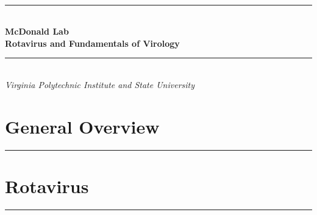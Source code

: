 \documentclass[11pt, final]{article}
\begin{document}
	
	\newcommand{\HRule}{\rule{\linewidth}{0.5mm}}


	\begin{titlepage}
		{~ \\[5cm] }
		
		\noindent \HRule \\[0.4cm]
		{ \Huge \bfseries McDonald Lab \\[0.4cm] }
		{ \huge \bfseries Rotavirus and Fundamentals of Virology \\ }
		\HRule \\[0.4cm]
		
		{ \large \emph{Virginia Polytechnic Institute and State University} }
	\end{titlepage}


	\tableofcontents
	\clearpage
	

	
	\part{General Overview}
	\HRule
	\clearpage
	
	\part{Rotavirus}
	\HRule
	

	\clearpage
	\nocite{*}
	
	

	\printindex
\end{document}
